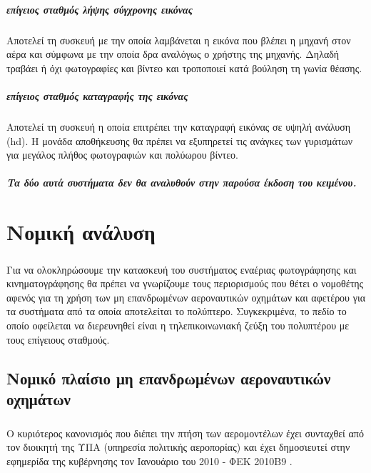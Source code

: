 \documentclass[a4paper, 12pt, twoside]{report}
\begin{document}
{{{{{{			\paragraph{επίγειος σταθμός λήψης σύγχρονης εικόνας}{Αποτελεί τη συσκευή με την οποία λαμβάνεται η εικόνα που βλέπει η μηχανή στον αέρα και σύμφωνα με την οποία δρα αναλόγως ο χρήστης της μηχανής. Δηλαδή τραβάει ή όχι φωτογραφίες και βίντεο και τροποποιεί κατά βούληση τη γωνία θέασης.
			}
			\paragraph{επίγειος σταθμός καταγραφής της εικόνας}{Αποτελεί τη συσκευή η οποία επιτρέπει την καταγραφή εικόνας σε υψηλή ανάλυση (hd). Η μονάδα αποθήκευσης θα πρέπει να εξυπηρετεί τις ανάγκες των γυρισμάτων για μεγάλος πλήθος φωτογραφιών και πολύωρου βίντεο.
			}
			\paragraph{Τα δύο αυτά συστήματα δεν θα αναλυθούν στην παρούσα έκδοση του κειμένου.}
	
	\chapter{Νομική ανάλυση}
		
		\paragraph{}{Για να ολοκληρώσουμε την κατασκευή του συστήματος εναέριας φωτογράφησης και κινηματογράφησης θα πρέπει να γνωρίζουμε τους περιορισμούς που θέτει ο νομοθέτης αφενός για τη χρήση των μη επανδρωμένων αεροναυτικών οχημάτων και αφετέρου για τα συστήματα από τα οποία αποτελείται το πολύπτερο. Συγκεκριμένα, το πεδίο το οποίο οφείλεται να διερευνηθεί είναι η τηλεπικοινωνιακή ζεύξη του πολυπτέρου με τους επίγειους σταθμούς. 
			}
			
		\section{Νομικό πλαίσιο μη επανδρωμένων αεροναυτικών οχημάτων}
			
			\paragraph{}{Ο κυριότερος κανονισμός που διέπει την πτήση των αερομοντέλων έχει συνταχθεί από τον διοικητή της ΥΠΑ (υπηρεσία πολιτικής αεροπορίας) και έχει δημοσιευτεί στην εφημερίδα της κυβέρνησης τον Ιανουάριο του 2010 - ΦΕΚ 2010Β9 \cite{ΦΕΚ2010Β9}.
			}
}}}}}}
\end{document}
